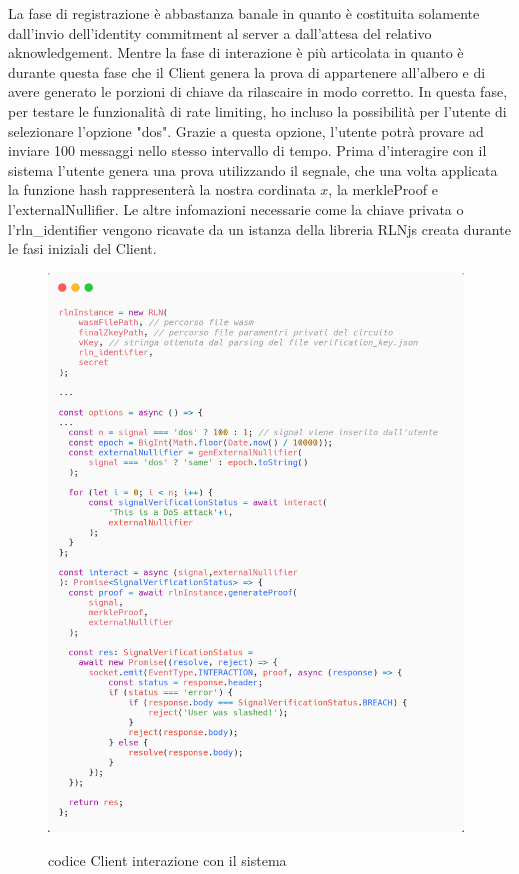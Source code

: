 La fase di registrazione è abbastanza banale in quanto è costituita solamente dall'invio dell'identity commitment al server a dall'attesa del relativo aknowledgement. Mentre la fase di interazione è più articolata in quanto è durante questa fase che il Client genera la prova di appartenere all'albero e di avere generato le porzioni di chiave da rilascaire in modo corretto. In questa fase, per testare le funzionalità di rate limiting, ho incluso la possibilità per l'utente di selezionare l'opzione "dos". Grazie a questa opzione, l'utente potrà provare ad inviare 100 messaggi nello stesso intervallo di tempo. Prima d'interagire con il sistema l'utente genera una prova utilizzando il segnale, che una volta applicata la funzione hash rappresenterà la nostra cordinata $x$, la merkleProof e l'externalNullifier. Le altre infomazioni necessarie come la chiave privata o l'rln\_identifier vengono ricavate da un istanza della libreria RLNjs creata durante le fasi iniziali del Client.\clearpage
\begin{figure}[H]
    \centering
    \includegraphics[width=11cm]{./chapters/3.poc/images/4.2.client.png}
    \label{fig:2.client}
    \captionsetup{justification=centering}
    \caption{codice Client interazione con il sistema}
\end{figure}

